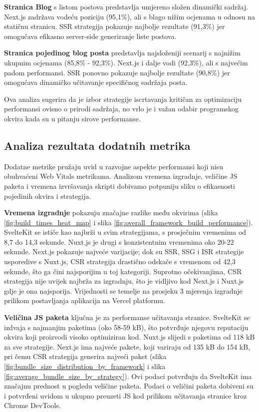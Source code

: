 \textbf{Stranica Blog} s listom postova predstavlja umjereno složen dinamički sadržaj. Next.js zadržava vodeću poziciju (95,1\%), ali s blago nižim ocjenama u odnosu na statičnu stranicu. SSR strategija pokazuje najbolje rezultate (91,3\%) jer omogućava efikasno server-side generiranje liste postova.

\textbf{Stranica pojedinog blog posta} predstavlja najsloženiji scenarij s najnižim ukupnim ocjenama (85,8\% - 92,3\%). Next.js i dalje vodi (92,3\%), ali s najvećim padom performansi. SSR ponovno pokazuje najbolje rezultate (90,8\%) jer omogućava dinamičko učitavanje specifičnog sadržaja posta.

\bigskip
Ova analiza sugerira da je izbor strategije iscrtavanja kritičan za optimizaciju performansi ovisno o prirodi sadržaja, no vrlo je i važan odabir programskog okvira kada su u pitanju sirove performanse.

\subsection{Analiza rezultata dodatnih metrika}

Dodatne metrike pružaju uvid u razvojne aspekte performansi koji nisu obuhvaćeni Web Vitals metrikama. Analizom vremena izgradnje, veličine JS paketa i vremena izvršavanja skripti dobivamo potpuniju sliku o efikasnosti pojedinih okvira i strategija.

\textbf{Vremena izgradnje} pokazuju značajne razlike među okvirima (slika \ref{fig:build_times_heat_map} i slika  \ref{fig:overall_framework_build_performance}). SvelteKit se ističe kao najbrži u svim strategijama, s prosječnim vremenima od 8,7 do 14,3 sekunde. Nuxt.js je drugi s konzistentnim vremenima oko 20-22 sekunde. Next.js pokazuje najveće varijacije; dok su SSR, SSG i ISR strategije usporedive s Nuxt.js, CSR strategija drastično odskače s vremenom od 42,3 sekunde, što ga čini najsporijim u toj kategoriji. Suprotno očekivanjima, CSR strategija nije uvijek najbrža za izgradnju, što je vidljivo kod Next.js i Nuxt.js gdje je ona najsporija. Vrijednosti se temelje na prosjeku 3 mjerenja izgradnje prilikom postavljanja aplikacija na Vercel platformu.

\textbf{Veličina JS paketa} ključna je za performanse učitavanja stranice. SvelteKit se izdvaja s najmanjim paketima (oko 58-59 kB), što potvrđuje njegovu reputaciju okvira koji proizvodi visoko optimiziran kod. Nuxt.js slijedi s paketima od 118 kB za sve strategije. Next.js ima najveće pakete, koji variraju od 135 kB do 154 kB, pri čemu CSR strategija generira najveći paket (slika \ref{fig:bundle_size_distribution_by_framework} i slika  \ref{fig:average_bundle_size_by_strategy}). Ovi podaci potvrđuju da SvelteKit ima značajnu prednost u pogledu veličine paketa. Podaci o veličini paketa dobiveni su i potvrđeni uvidom u ukupno preuzeti JS kod prilikom učitavanja stranice kroz Chrome DevTools.

